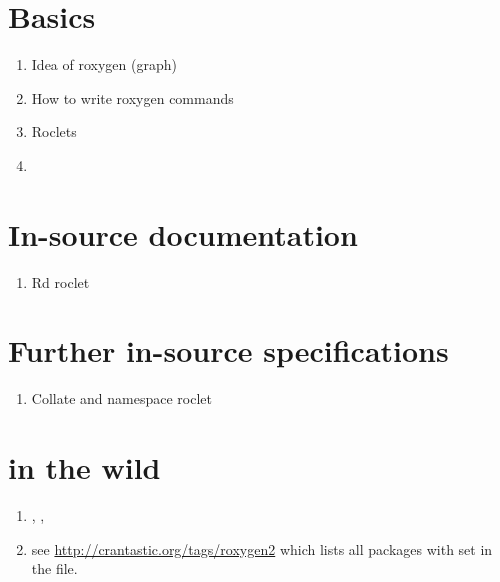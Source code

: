 \section{Basics\label{basics}}

\begin{enumerate}
  \item Idea of roxygen (graph)
  \item How to write roxygen commands
  \item Roclets
  \item {}
\end{enumerate}



\section{In-source documentation\label{doc}}


\begin{enumerate}
  \item Rd roclet
\end{enumerate}




\section{Further in-source specifications\label{doc}}

\begin{enumerate}
  \item Collate and namespace roclet
\end{enumerate}



\section{ in the wild\label{doc}}

\begin{enumerate}
  \item {}, , 
  \item see \url{http://crantastic.org/tags/roxygen2} which lists all
    packages with  set in the
     file.
\end{enumerate}
 


